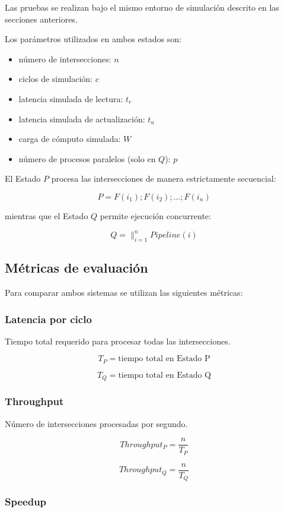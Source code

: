 \documentclass[12pt]{article}
\begin{document}
Las pruebas se realizan bajo el mismo entorno de simulación descrito en
las secciones anteriores.

Los parámetros utilizados en ambos estados son:

\begin{itemize}
\item número de intersecciones: \(n\)
\item ciclos de simulación: \(c\)
\item latencia simulada de lectura: \(t_r\)
\item latencia simulada de actualización: \(t_u\)
\item carga de cómputo simulada: \(W\)
\item número de procesos paralelos (solo en \(Q\)): \(p\)
\end{itemize}

El Estado \(P\) procesa las intersecciones de manera estrictamente
secuencial:

\[
P = F(i_1); F(i_2); \dots ; F(i_n)
\]

mientras que el Estado \(Q\) permite ejecución concurrente:

\[
Q = \parallel_{i=1}^{n} Pipeline(i)
\]

\subsection{Métricas de evaluación}

Para comparar ambos sistemas se utilizan las siguientes métricas:

\subsubsection{Latencia por ciclo}

Tiempo total requerido para procesar todas las intersecciones.

\[
T_P = \text{tiempo total en Estado P}
\]

\[
T_Q = \text{tiempo total en Estado Q}
\]

\subsubsection{Throughput}

Número de intersecciones procesadas por segundo.

\[
Throughput_P = \frac{n}{T_P}
\]

\[
Throughput_Q = \frac{n}{T_Q}
\]

\subsubsection{Speedup}
\end{document}
